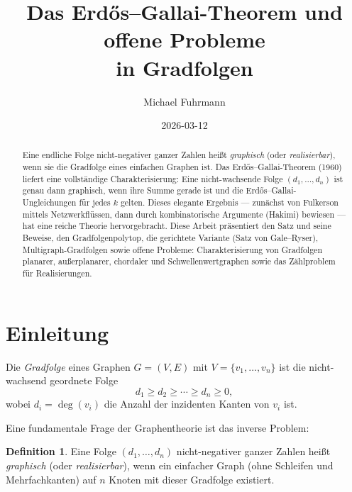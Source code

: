 \documentclass[12pt,a4paper]{amsart}
\theoremstyle{definition}
\newtheorem{definition_de}[theorem]{Definition}
\theoremstyle{remark}
\begin{document}
\title{Das Erd\H{o}s--Gallai-Theorem und offene Probleme\\
in Gradfolgen}

\author{Michael Fuhrmann}
\address{Specialist Mathematics Project, Build 168}
\date{2026-03-12}

\begin{abstract}
Eine endliche Folge nicht-negativer ganzer Zahlen heißt \emph{graphisch}
(oder \emph{realisierbar}), wenn sie die Gradfolge eines einfachen Graphen ist.
Das Erd\H{o}s--Gallai-Theorem (1960) liefert eine vollständige Charakterisierung:
Eine nicht-wachsende Folge $(d_1, \ldots, d_n)$ ist genau dann graphisch, wenn
ihre Summe gerade ist und die Erd\H{o}s--Gallai-Ungleichungen für jedes $k$ gelten.
Dieses elegante Ergebnis --- zunächst von Fulkerson mittels Netzwerkflüssen,
dann durch kombinatorische Argumente (Hakimi) bewiesen --- hat eine reiche Theorie
hervorgebracht.
Diese Arbeit präsentiert den Satz und seine Beweise, den Gradfolgenpolytop,
die gerichtete Variante (Satz von Gale--Ryser), Multigraph-Gradfolgen sowie
offene Probleme: Charakterisierung von Gradfolgen planarer, außerplanarer,
chordaler und Schwellenwertgraphen sowie das Zählproblem für Realisierungen.
\end{abstract}

\maketitle

\tableofcontents

\section{Einleitung}

Die \emph{Gradfolge} eines Graphen $G = (V, E)$ mit $V = \{v_1, \ldots, v_n\}$
ist die nicht-wachsend geordnete Folge
\[
  d_1 \geq d_2 \geq \cdots \geq d_n \geq 0,
\]
wobei $d_i = \deg(v_i)$ die Anzahl der inzidenten Kanten von $v_i$ ist.

Eine fundamentale Frage der Graphentheorie ist das inverse Problem:

\begin{definition_de}
Eine Folge $(d_1, \ldots, d_n)$ nicht-negativer ganzer Zahlen heißt
\emph{graphisch} (oder \emph{realisierbar}), wenn ein einfacher Graph
(ohne Schleifen und Mehrfachkanten) auf $n$ Knoten mit dieser Gradfolge existiert.
\end{definition_de}
\end{document}
